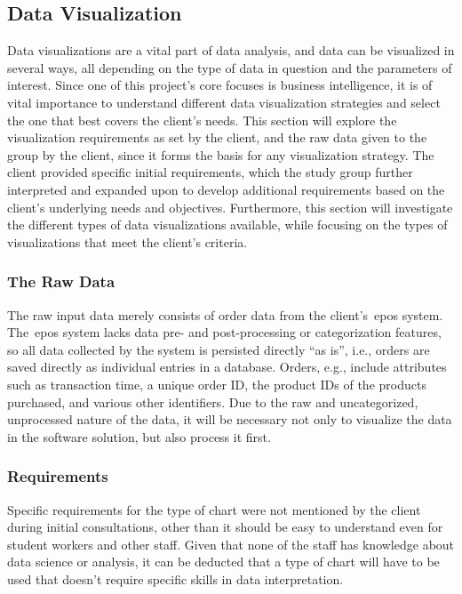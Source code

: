 \subsection{Data Visualization}\label{subsec:data-visualization}

Data visualizations are a vital part of data analysis, and data can be visualized in several ways, all depending on the
type of data in question and the parameters of interest.
Since one of this project's core focuses is business intelligence, it is of vital importance to understand different
data visualization strategies and select the one that best covers the client's needs.
This section will explore the visualization requirements as set by the client, and the raw data given to the group by
the client, since it forms the basis for any visualization strategy.
The client provided specific initial requirements, which the study group further interpreted and expanded upon to
develop additional requirements based on the client's underlying needs and objectives.
Furthermore, this section will investigate the different types of data visualizations available, while focusing on the
types of visualizations that meet the client's criteria.

\subsubsection{The Raw Data}\label{subsubsec:the-client's-raw-data}
The raw input data merely consists of order data from the client's~\acrshort{epos} system.
The~\acrshort{epos} system lacks data pre- and post-processing or categorization features, so all data collected by the
system is persisted directly ``as is'', i.e., orders are saved directly as individual entries in a database.
Orders, e.g., include attributes such as transaction time, a unique order ID, the product IDs of the products purchased,
and various other identifiers.
Due to the raw and uncategorized, unprocessed nature of the data, it will be necessary not only to visualize the data in
the software solution, but also process it first.

\subsubsection{Requirements}\label{subsubsec:requirements}
Specific requirements for the type of chart were not mentioned by the client during initial consultations, other than it
should be easy to understand even for student workers and other staff.
Given that none of the staff has knowledge about data science or analysis, it can be deducted that a type of chart will
have to be used that doesn't require specific skills in data interpretation.

